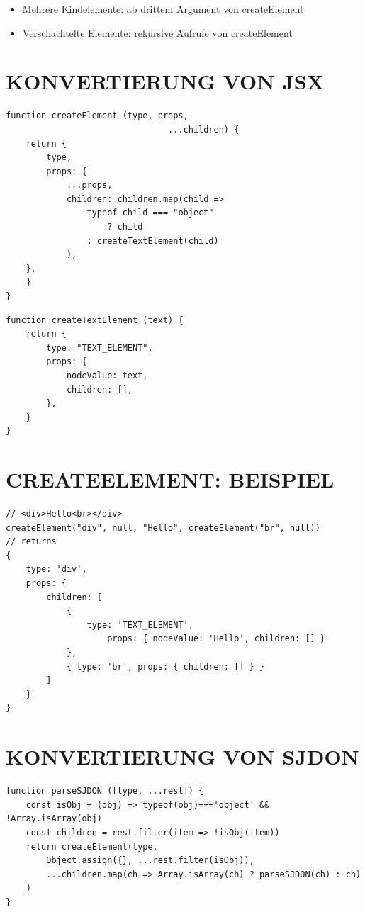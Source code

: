\documentclass[10pt]{article}
\begin{document}
\begin{itemize}
  \item Mehrere Kindelemente: ab drittem Argument von createElement
  \item Verschachtelte Elemente: rekursive Aufrufe von createElement
\end{itemize}

\section*{KONVERTIERUNG VON JSX}
\begin{verbatim}
function createElement (type, props,
                                ...children) {
    return {
        type,
        props: {
            ...props,
            children: children.map(child =>
                typeof child === "object"
                    ? child
                : createTextElement(child)
            ),
    },
    }
}
\end{verbatim}

\begin{verbatim}
function createTextElement (text) {
    return {
        type: "TEXT_ELEMENT",
        props: {
            nodeValue: text,
            children: [],
        },
    }
}
\end{verbatim}

\section*{CREATEELEMENT: BEISPIEL}
\begin{verbatim}
// <div>Hello<br></div>
createElement("div", null, "Hello", createElement("br", null))
// returns
{
    type: 'div',
    props: {
        children: [
            {
                type: 'TEXT_ELEMENT',
                    props: { nodeValue: 'Hello', children: [] }
            },
            { type: 'br', props: { children: [] } }
        ]
    }
}
\end{verbatim}

\section*{KONVERTIERUNG VON SJDON}
\begin{verbatim}
function parseSJDON ([type, ...rest]) {
    const isObj = (obj) => typeof(obj)==='object' && !Array.isArray(obj)
    const children = rest.filter(item => !isObj(item))
    return createElement(type,
        Object.assign({}, ...rest.filter(isObj)),
        ...children.map(ch => Array.isArray(ch) ? parseSJDON(ch) : ch)
    )
}
\end{verbatim}
\end{document}
